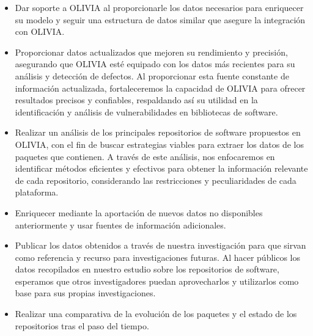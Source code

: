
\begin{itemize}
    \item Dar soporte a OLIVIA al proporcionarle los datos necesarios para enriquecer su modelo y seguir una estructura de datos similar que asegure la integración con OLIVIA.
    
    \item Proporcionar datos actualizados que mejoren su rendimiento y precisión, asegurando que OLIVIA esté equipado con los datos más recientes para su análisis y detección de defectos. Al proporcionar esta fuente constante de información actualizada, fortaleceremos la capacidad de OLIVIA para ofrecer resultados precisos y confiables, respaldando así su utilidad en la identificación y análisis de vulnerabilidades en bibliotecas de software.
    
    \item Realizar un análisis de los principales repositorios de software propuestos en OLIVIA, con el fin de buscar estrategias viables para extraer los datos de los paquetes que contienen. A través de este análisis, nos enfocaremos en identificar métodos eficientes y efectivos para obtener la información relevante de cada repositorio, considerando las restricciones y peculiaridades de cada plataforma.
    
    \item Enriquecer mediante la aportación de nuevos datos no disponibles anteriormente y usar fuentes de información adicionales.
    
    \item Publicar los datos obtenidos a través de nuestra investigación para que sirvan como referencia y recurso para investigaciones futuras. Al hacer públicos los datos recopilados en nuestro estudio sobre los repositorios de software, esperamos que otros investigadores puedan aprovecharlos y utilizarlos como base para sus propias investigaciones.
    
    \item Realizar una comparativa de la evolución de los paquetes y el estado de los repositorios tras el paso del tiempo.
    \end{itemize}